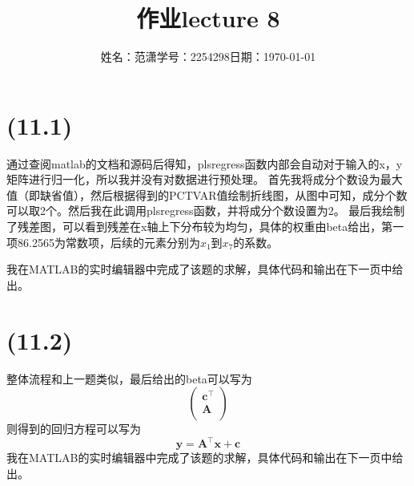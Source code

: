 \documentclass[a4paper]{article}
\title{作业{\hspace{1ex}}lecture 8}
\author{姓名：范潇{\quad}学号：2254298{\quad}日期：\today}
\date{}
\begin{document}
\maketitle
\section{(11.1)}
通过查阅matlab的文档和源码后得知，plsregress函数内部会自动对于输入的x，y矩阵进行归一化，所以我并没有对数据进行预处理。
首先我将成分个数设为最大值（即缺省值），然后根据得到的PCTVAR值绘制折线图，从图中可知，成分个数可以取2个。然后我在此调用plsregress函数，并将成分个数设置为2。
最后我绘制了残差图，可以看到残差在x轴上下分布较为均匀，具体的权重由beta给出，第一项86.2565为常数项，后续的元素分别为$x_1$到$x_7$的系数。

我在MATLAB的实时编辑器中完成了该题的求解，具体代码和输出在下一页中给出。
\newpage
\section{(11.2)}
整体流程和上一题类似，最后给出的beta可以写为
$$
\begin{pmatrix}
    \mathbf{c}^{\top}\\
    \mathbf{A}\\
\end{pmatrix}
$$
则得到的回归方程可以写为
\[\mathbf{y}=\mathbf{A}^{\top}\mathbf{x}+\mathbf{c}\]
我在MATLAB的实时编辑器中完成了该题的求解，具体代码和输出在下一页中给出。
\end{document}
